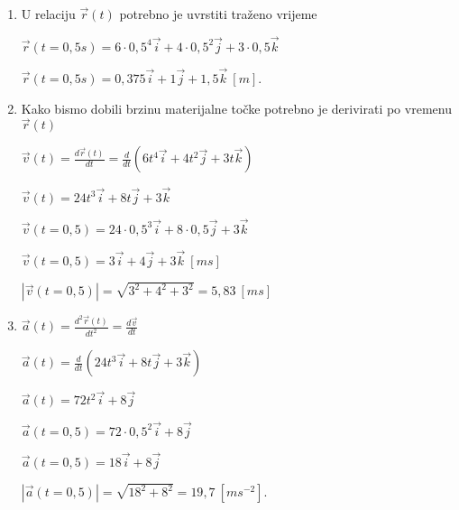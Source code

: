 

\begin{enumerate}[label=\alph*)]
 \item U relaciju $\vec{r}(t)$ potrebno je uvrstiti traženo vrijeme
 
 $\vec{r}(t=0,5s)=6\cdot 0,5^4\vec{i}+4\cdot0,5^2\vec{j}+3\cdot0,5\vec{k}$
 
 $ \vec{r}(t=0,5s) = 0,375\vec{i}+1\vec{j}+1,5\vec{k}\ [m] $.
 
 \item  Kako bismo dobili brzinu materijalne točke potrebno je derivirati po vremenu $\vec{r}(t)$
 
 $\vec{v}(t)  = \frac{d\vec{r}(t)}{dt}=\frac{d}{dt}\left( 6t^4\vec{i}+4t^2\vec{j} + 3t\vec{k}  \right) $
 
 $\vec{v}(t) = 24t^3\vec{i}+8t\vec{j}+3\vec{k}  $
 
 $\vec{v}(t=0,5) = 24\cdot0,5^3\vec{i}+8\cdot0,5\vec{j}+3\vec{k}  $
 
 $\vec{v}(t=0,5) = 3\vec{i}+4\vec{j}+3\vec{k}\ [ms] $
 
 $|\vec{v}(t=0,5)| = \sqrt{3^2+4^2+3^2}=5,83\ [ms] $
 
 \item $\vec{a}(t)  = \frac{d^2\vec{r}(t)}{dt^2}=\frac{d\vec{v}}{dt}$
 
 $\vec{a}(t)  = \frac{d}{dt} \left(  24t^3\vec{i}+8t\vec{j}+3\vec{k} \right) $
 
 $ \vec{a}(t)  = 72t^2\vec{i}+8\vec{j}$
 
  $ \vec{a}(t=0,5)  = 72\cdot 0,5^2\vec{i}+8\vec{j}$
  
  $ \vec{a}(t=0,5)  = 18\vec{i}+8\vec{j}$
  
  $ |\vec{a}(t=0,5)|  = \sqrt{ 18^2+8^2}=19,7\ [ms^{-2}]$.
\end{enumerate}
